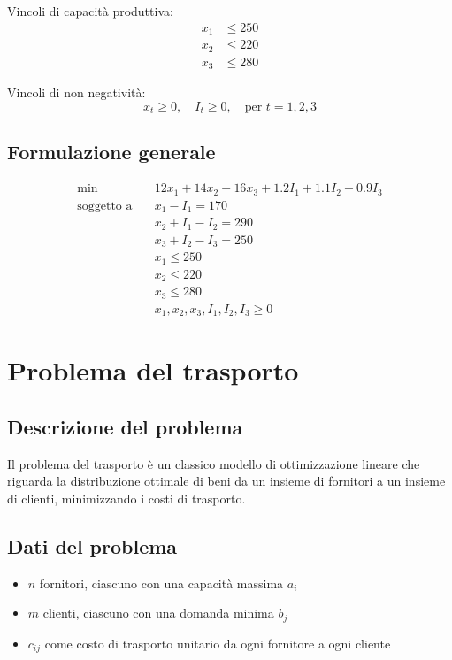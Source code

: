 Vincoli di capacità produttiva:
\[
\begin{aligned}
x_1 &\leq 250 \\
x_2 &\leq 220 \\
x_3 &\leq 280
\end{aligned}
\]

Vincoli di non negatività:
\[
x_t \geq 0, \quad I_t \geq 0, \quad \text{per } t = 1, 2, 3
\]

\subsection{Formulazione generale}
\[
\begin{aligned}
\min \quad & 12x_1 + 14x_2 + 16x_3 + 1.2I_1 + 1.1I_2 + 0.9I_3 \\
\text{soggetto a} \quad 
& x_1 - I_1 = 170 \\
& x_2 + I_1 - I_2 = 290 \\
& x_3 + I_2 - I_3 = 250 \\
& x_1 \leq 250 \\
& x_2 \leq 220 \\
& x_3 \leq 280 \\
& x_1, x_2, x_3, I_1, I_2, I_3 \geq 0
\end{aligned}
\]

\section{Problema del trasporto}
\subsection{Descrizione del problema}
Il problema del trasporto è un classico modello di ottimizzazione lineare 
che riguarda la distribuzione ottimale di beni da un insieme di fornitori 
a un insieme di clienti, minimizzando i costi di trasporto.

\subsection{Dati del problema}
\begin{itemize}
    \item $n$ fornitori, ciascuno con una capacità massima $a_i$
    \item $m$ clienti, ciascuno con una domanda minima $b_j$
    \item $c_{ij}$ come costo di trasporto unitario da ogni fornitore a ogni cliente
\end{itemize}

